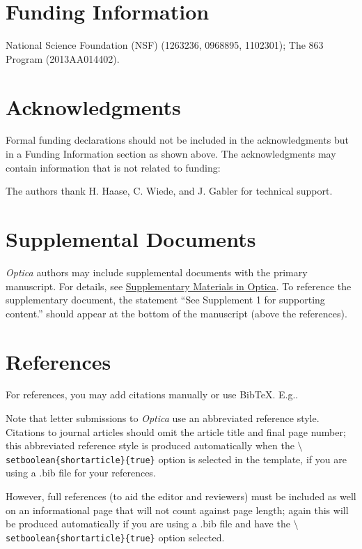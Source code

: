 \documentclass[9pt,twocolumn,twoside]{idsi}
\begin{document}
\section*{Funding Information}
National Science Foundation (NSF) (1263236, 0968895, 1102301); The 863 Program (2013AA014402).

\section*{Acknowledgments}

Formal funding declarations should not be included in the acknowledgments but in a Funding Information section as shown above. The acknowledgments may contain information that is not related to funding:

The authors thank H. Haase, C. Wiede, and J. Gabler for technical support.

\section*{Supplemental Documents}
\emph{Optica} authors may include supplemental documents with the primary manuscript. For details, see \href{http://www.opticsinfobase.org/submit/style/supplementary-materials-optica.cfm}{Supplementary Materials in Optica}. To reference the supplementary document, the statement ``See Supplement 1 for supporting content.'' should appear at the bottom of the manuscript (above the references).

\section*{References}

For references, you may add citations manually or use BibTeX. E.g..

Note that letter submissions to \emph{Optica} use an abbreviated reference style. Citations to journal articles should omit the article title and final page number; this abbreviated reference style is produced automatically when the \texttt{$\setminus$setboolean\{shortarticle\}\{true\}} option is selected in the template, if you are using a .bib file for your references. 

However, full references (to aid the editor and reviewers) must be included as well on an informational page that will not count against page length; again this will be produced automatically if you are using a .bib file and have the \texttt{$\setminus$setboolean\{shortarticle\}\{true\}} option selected.
\end{document}
